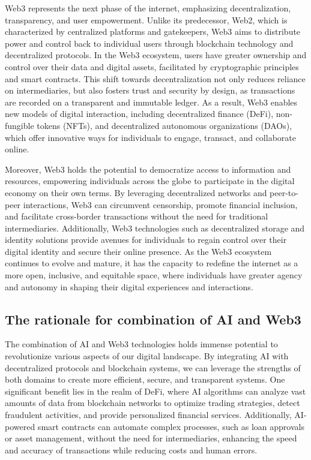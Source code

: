 \documentclass[conference]{IEEEtran}
\begin{document}
Web3 represents the next phase of the internet, emphasizing decentralization, transparency, and user empowerment. Unlike its predecessor, Web2, which is characterized by centralized platforms and gatekeepers, Web3 aims to distribute power and control back to individual users through blockchain technology and decentralized protocols. In the Web3 ecosystem, users have greater ownership and control over their data and digital assets, facilitated by cryptographic principles and smart contracts. This shift towards decentralization not only reduces reliance on intermediaries, but also fosters trust and security by design, as transactions are recorded on a transparent and immutable ledger. As a result, Web3 enables new models of digital interaction, including decentralized finance (DeFi), non-fungible tokens (NFTs), and decentralized autonomous organizations (DAOs), which offer innovative ways for individuals to engage, transact, and collaborate online.

Moreover, Web3 holds the potential to democratize access to information and resources, empowering individuals across the globe to participate in the digital economy on their own terms. By leveraging decentralized networks and peer-to-peer interactions, Web3 can circumvent censorship, promote financial inclusion, and facilitate cross-border transactions without the need for traditional intermediaries. Additionally, Web3 technologies such as decentralized storage and identity solutions provide avenues for individuals to regain control over their digital identity and secure their online presence. As the Web3 ecosystem continues to evolve and mature, it has the capacity to redefine the internet as a more open, inclusive, and equitable space, where individuals have greater agency and autonomy in shaping their digital experiences and interactions.


\subsection{The rationale for combination of AI and Web3}
The combination of AI and Web3 technologies holds immense potential to revolutionize various aspects of our digital landscape. By integrating AI with decentralized protocols and blockchain systems, we can leverage the strengths of both domains to create more efficient, secure, and transparent systems. One significant benefit lies in the realm of DeFi, where AI algorithms can analyze vast amounts of data from blockchain networks to optimize trading strategies, detect fraudulent activities, and provide personalized financial services. Additionally, AI-powered smart contracts can automate complex processes, such as loan approvals or asset management, without the need for intermediaries, enhancing the speed and accuracy of transactions while reducing costs and human errors.
\end{document}
